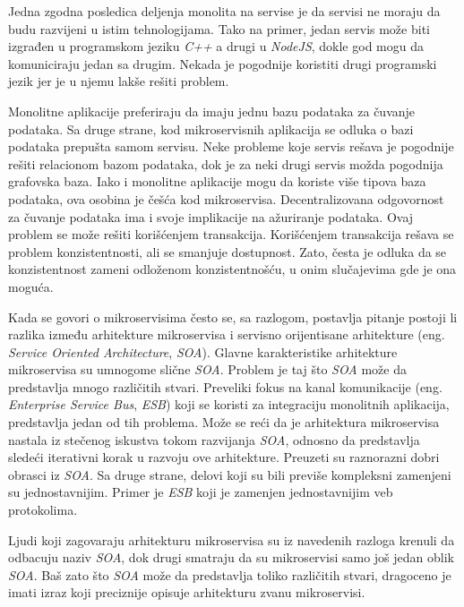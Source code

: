 Jedna zgodna posledica deljenja monolita na servise je da servisi ne moraju da budu razvijeni u istim 
tehnologijama. Tako na primer, jedan servis može biti izgrađen u programskom jeziku \textit{C++} a drugi u 
\textit{NodeJS}, dokle god mogu da komuniciraju jedan sa drugim. Nekada je pogodnije koristiti drugi programski 
jezik jer je u njemu lakše rešiti problem.

Monolitne aplikacije preferiraju da imaju jednu bazu podataka za čuvanje podataka. Sa druge strane, kod 
mikroservisnih aplikacija se odluka o bazi podataka prepušta samom servisu. Neke probleme koje servis 
rešava je pogodnije rešiti relacionom bazom podataka, dok je za neki drugi servis možda pogodnija grafovska baza.
Iako i monolitne aplikacije mogu da koriste više tipova baza podataka, ova osobina je češća kod 
mikroservisa. Decentralizovana odgovornost za čuvanje podataka ima i svoje implikacije na ažuriranje 
podataka. Ovaj problem se može rešiti korišćenjem transakcija. Korišćenjem transakcija rešava se problem 
konzistentnosti, ali se smanjuje dostupnost. Zato, česta je odluka da se konzistentnost zameni 
odloženom konzistentnošću, u onim slučajevima gde je ona moguća. 

Kada se govori o mikroservisima često se, sa razlogom, postavlja pitanje postoji li razlika između arhitekture
mikroservisa i servisno orijentisane arhitekture (eng. \textit{Service Oriented Architecture}, \textit{SOA}). 
Glavne karakteristike arhitekture mikroservisa su umnogome slične \textit{SOA}. Problem je taj što \textit{SOA} 
može da predstavlja mnogo različitih stvari. Preveliki fokus na kanal komunikacije 
(eng. \textit{Enterprise Service Bus}, \textit{ESB}) koji se koristi za integraciju monolitnih aplikacija, 
predstavlja jedan od tih problema. Može se reći da je arhitektura mikroservisa nastala iz stečenog iskustva tokom 
razvijanja \textit{SOA}, odnosno da predstavlja sledeći iterativni korak u razvoju ove arhitekture. 
Preuzeti su raznorazni dobri obrasci iz \textit{SOA}. Sa druge strane, delovi koji su bili previše kompleksni 
zamenjeni su jednostavnijim. Primer je \textit{ESB} koji je zamenjen jednostavnijim veb protokolima. 

Ljudi koji zagovaraju arhitekturu mikroservisa su iz navedenih razloga krenuli da odbacuju naziv \textit{SOA}, 
dok drugi smatraju da su mikroservisi samo još jedan oblik \textit{SOA}. Baš zato što \textit{SOA} 
može da predstavlja toliko različitih stvari, dragoceno je imati izraz koji preciznije opisuje arhitekturu 
zvanu mikroservisi.~\cite{martinfowler_microservices}

